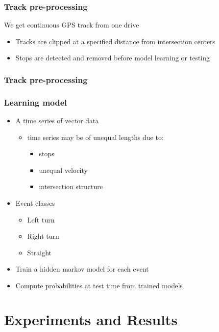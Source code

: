 \documentclass{beamer}
\begin{document}
\begin{frame}
\frametitle{Track pre-processing}
	We get continuous GPS track from one drive
	\begin{itemize}
	\item Tracks are clipped at a specified distance from intersection centers
	\item Stops are detected and removed before model learning or testing
	\end{itemize}
	
\end{frame}

\begin{frame}
\frametitle{Track pre-processing}
	
	
\end{frame}


\begin{frame}
\frametitle{Learning model}
	\begin{itemize}
	  \item A time series of vector data
	  \begin{itemize}
	    \item time series may be of unequal lengths due to:
	    \begin{itemize}
	      \item stops
	      \item unequal velocity
	      \item intersection structure
	      \end{itemize}
	      \end{itemize}
	  \item Event classes
	  \begin{itemize}
	    \item Left turn
	    \item Right turn
	    \item Straight
	   \end{itemize}
	   \item Train a hidden markov model for each event
	   \item Compute probabilities at test time from trained models
	\end{itemize}
\end{frame}

\section{Experiments and Results}
\end{document}
